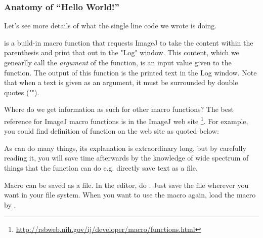 \subsubsection{Anatomy of ``Hello World!''}

Let's see more details of what the single line code we wrote is doing.

 is a build-in macro function that requests ImageJ to take the content within the parenthesis and print that out in the "Log" window. This content, which we genearlly call the \textit{argument} of the function, is an input value given to the function. The output of this function is the printed text in the Log window. Note that when a text is given as an argument, it must be surrounded by double quotes ("").
 
Where do we get information as such for other macro functions? The best reference for ImageJ macro functions is in the ImageJ web site
\footnote{\url{http://rsbweb.nih.gov/ij/developer/macro/functions.html}}. 
For example, you could find definition of  function on the web site as quoted below:\\

\begin{indentCom}

\end{indentCom}

As  can do many things, its explanation is extraordinary long, but by carefully reading it, you will save time afterwards by the knowledge of wide spectrum of things that the  function can do e.g. directly save text as a file.

Macro can be saved as a file.
In the editor, do . Just save the file wherever you want in your file system. When you want to use the macro again, load the macro by .

